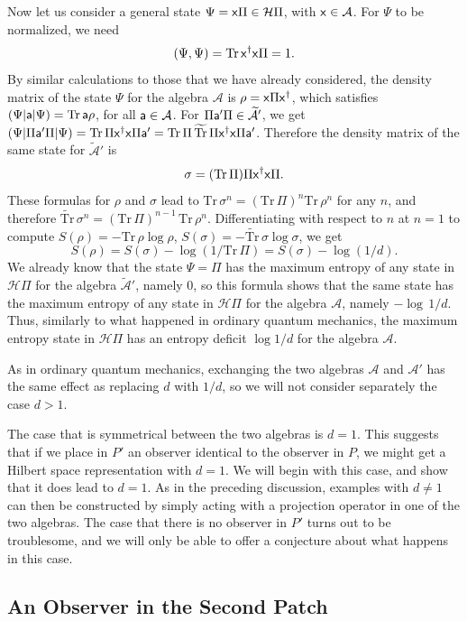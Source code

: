 \documentclass[11pt,a4paper]{article}
\def\t{{ \sf t}}
\def\a{{\sf a}}
\def\x{{\sf x}}
\def\be{\begin{equation}}
\def\ee{\end{equation}}
\def\A{{\mathcal A}}
\def\t{\widetilde }
\def\H{{\mathcal H}}
\def\Tr{{\mathrm{Tr}}}
\begin{document}
Now let us consider a general state $\Psi=\x\Pi\in \H\Pi$, with $\x\in\A$. 
For $\Psi$ to be normalized, we need
\be\label{normo}(\Psi,\Psi)= \Tr\, \x^\dagger\x \Pi =1.\ee
By similar calculations to those that we have already considered, the density matrix of the state $\Psi$ for the algebra $\A$ is
$\rho= \x\Pi\x^\dagger$, which satisfies $(\Psi|\a|\Psi)=\Tr\,\a\rho$, for all $\a\in\A$.   For $\Pi\a'\Pi\in\t\A'$, we get $(\Psi|\Pi\a'\Pi|\Psi)=\Tr\,\Pi\x^\dagger\x \Pi \a'
=\Tr\,\Pi\, \t\Tr \,\Pi \x^\dagger \x \Pi\a'$.   Therefore the density matrix of the same state for $\t\A'$ is
\be\label{wormo} \sigma=(\Tr\,\Pi) \Pi \x^\dagger\x \Pi.\ee
These formulas for $\rho$ and $\sigma$ lead to $\Tr\,\sigma^n=(\Tr\,\Pi)^n \Tr\,\rho^n$ for any $n$, and therefore $\t\Tr\,\sigma^n=(\Tr\,\Pi)^{n-1} \,\Tr\,\rho^n$.
Differentiating with respect to $n$ at $n=1$ to compute $S(\rho)=-\Tr\,\rho\log\rho$, $S(\sigma)=-\t\Tr\,\sigma\log\sigma$, we get
\be\label{enred} S(\rho) = S(\sigma) -\log (1/\Tr\, \Pi)=S(\sigma)-\log (1/d).   \ee
We already know that the state $\Psi=\Pi$ has the maximum entropy of any state in $\H\Pi$ for the algebra $\t\A'$, namely $0$, so this
formula shows that the same state has the maximum entropy of any state in $\H\Pi$ for the algebra $\A$, namely $-\log\,1/d$.  Thus, similarly to what happened
in ordinary quantum mechanics, the maximum entropy state in $\H\Pi$ has an entropy deficit $\log 1/d$ for the algebra $\A$.

As in ordinary quantum mechanics, exchanging the two algebras $\A$ and $\A'$ has the same effect as replacing $d$ with $1/d$, so we will not consider
separately the case $d>1$.

The case that is symmetrical between the two algebras is $d=1$.   This suggests that if we place in $P'$ an observer identical to the observer in $P$,
we might get a Hilbert space representation with $d=1$.  We will begin with this case, and show that it does lead to $d=1$.  As in the preceding discussion,
examples with $d\not=1$ can then be constructed by simply acting with a projection operator in one of the two algebras.  The case that there is no observer
in $P'$ turns out to be troublesome, and we will only be able to offer a conjecture about what happens in this case.

\subsection{An Observer in the Second Patch}\label{second}
\end{document}
